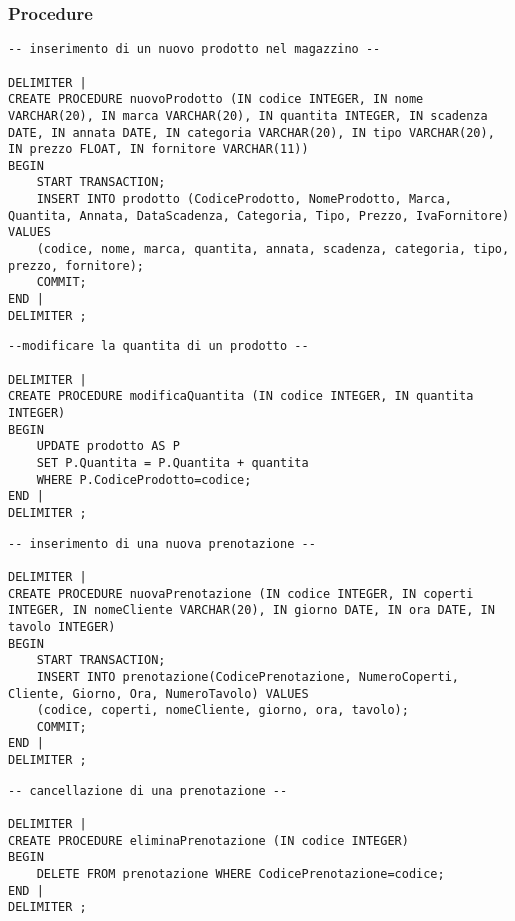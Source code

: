 \subsubsection{Procedure}
\begin{lstlisting}[title=Operazione 1, style=mysqlStyle]
-- inserimento di un nuovo prodotto nel magazzino --

DELIMITER |
CREATE PROCEDURE nuovoProdotto (IN codice INTEGER, IN nome VARCHAR(20), IN marca VARCHAR(20), IN quantita INTEGER, IN scadenza DATE, IN annata DATE, IN categoria VARCHAR(20), IN tipo VARCHAR(20), IN prezzo FLOAT, IN fornitore VARCHAR(11))
BEGIN
    START TRANSACTION;
    INSERT INTO prodotto (CodiceProdotto, NomeProdotto, Marca, Quantita, Annata, DataScadenza, Categoria, Tipo, Prezzo, IvaFornitore) VALUES
    (codice, nome, marca, quantita, annata, scadenza, categoria, tipo, prezzo, fornitore);
    COMMIT;
END |
DELIMITER ;
\end{lstlisting}

\begin{lstlisting}[title=Operazione 2, style=mysqlStyle]
--modificare la quantita di un prodotto --

DELIMITER |
CREATE PROCEDURE modificaQuantita (IN codice INTEGER, IN quantita INTEGER)
BEGIN
    UPDATE prodotto AS P
    SET P.Quantita = P.Quantita + quantita
    WHERE P.CodiceProdotto=codice;
END |
DELIMITER ;
\end{lstlisting}

\begin{lstlisting}[title=Operazione 3, style=mysqlStyle]
-- inserimento di una nuova prenotazione --

DELIMITER |
CREATE PROCEDURE nuovaPrenotazione (IN codice INTEGER, IN coperti INTEGER, IN nomeCliente VARCHAR(20), IN giorno DATE, IN ora DATE, IN tavolo INTEGER)
BEGIN
    START TRANSACTION;
    INSERT INTO prenotazione(CodicePrenotazione, NumeroCoperti, Cliente, Giorno, Ora, NumeroTavolo) VALUES
    (codice, coperti, nomeCliente, giorno, ora, tavolo);
    COMMIT;
END |
DELIMITER ;
\end{lstlisting}

\begin{lstlisting}[title=Operazione 4, style=mysqlStyle]
-- cancellazione di una prenotazione --

DELIMITER |
CREATE PROCEDURE eliminaPrenotazione (IN codice INTEGER)
BEGIN
    DELETE FROM prenotazione WHERE CodicePrenotazione=codice;
END |
DELIMITER ;
\end{lstlisting}

